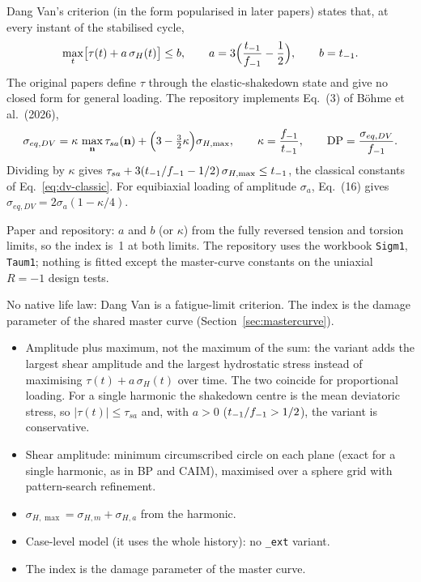  Dang Van's criterion (in the form popularised in later papers) states that, at every
instant of the stabilised cycle,
\begin{equation}
\max_t\bigl[\tau(t) + a\,\sigma_H(t)\bigr] \le b , \qquad
a = 3\Bigl(\frac{t_{-1}}{f_{-1}} - \frac12\Bigr) , \qquad b = t_{-1} .
\label{eq:dv-classic}
\end{equation}
The original papers define $\tau$ through the elastic-shakedown state and give no closed form for
general loading. The repository implements Eq.~(3) of B\"ohme et al.\ (2026),
\begin{equation}
\sigma_{eq,DV} = \kappa\,\max_{\mathbf n}\tau_{sa}(\mathbf n) + \Bigl(3 - \tfrac32\kappa\Bigr)\sigma_{H,\max} ,
\qquad \kappa = \frac{f_{-1}}{t_{-1}} , \qquad \mathrm{DP} = \frac{\sigma_{eq,DV}}{f_{-1}} .
\label{eq:dv-main}
\end{equation}
Dividing by $\kappa$ gives $\tau_{sa}+3(t_{-1}/f_{-1}-1/2)\,\sigma_{H,\max}\le t_{-1}$, the classical constants of
Eq.~\eqref{eq:dv-classic}. For equibiaxial loading of amplitude $\sigma_a$, Eq.~(16) gives
$\sigma_{eq,DV}=2\sigma_a(1-\kappa/4)$.

 Paper and repository: $a$ and $b$ (or $\kappa$) from the fully reversed
tension and torsion limits, so the index is~1 at both limits. The repository uses the workbook
\texttt{Sigm1}, \texttt{Taum1}; nothing is fitted except the master-curve constants on the uniaxial
$R=-1$ design tests.

 No native life law: Dang Van is a fatigue-limit criterion. The index is the damage parameter
of the shared master curve (Section~\ref{sec:mastercurve}).

\begin{itemize}
\item Amplitude plus maximum, not the maximum of the sum: the variant adds the largest shear amplitude
  and the largest hydrostatic stress instead of maximising $\tau(t)+a\,\sigma_H(t)$ over time. The two
  coincide for proportional loading. For a single harmonic the shakedown centre is the mean deviatoric
  stress, so $|\tau(t)|\le\tau_{sa}$ and, with $a>0$ ($t_{-1}/f_{-1}>1/2$), the variant is conservative.
\item Shear amplitude: minimum circumscribed circle on each plane (exact for a single harmonic, as in
  BP and CAIM), maximised over a sphere grid with pattern-search refinement.
\item $\sigma_{H,\max}=\sigma_{H,m}+\sigma_{H,a}$ from the harmonic.
\item Case-level model (it uses the whole history): no \texttt{\_ext} variant.
\item The index is the damage parameter of the master curve.
\end{itemize}

